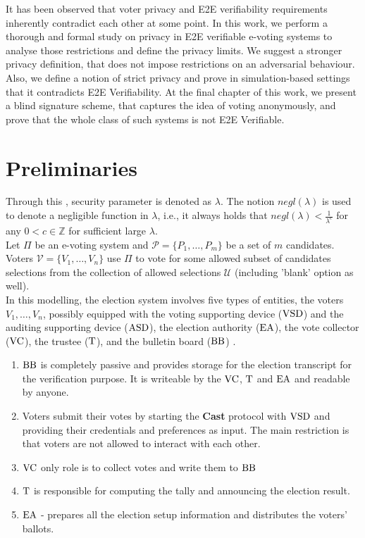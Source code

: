 It has been observed that voter privacy and E2E verifiability requirements inherently contradict each other at some point. In this work, we perform a thorough and formal study on privacy in E2E verifiable e-voting systems to analyse those restrictions and define the privacy limits. We suggest a stronger privacy definition, that does not impose restrictions on an adversarial behaviour. Also, we define a notion of strict privacy and prove in simulation-based settings that it contradicts E2E Verifiability. At the final chapter of this work, we present a blind signature scheme, that captures the idea of voting anonymously, and prove that the whole class of such systems is not E2E Verifiable.  

\section{Preliminaries}
Through this , security parameter is denoted as $\lambda$. The notion $negl(\lambda)$ is used to denote a negligible function in $\lambda$, i.e., it always holds that $negl(\lambda) < \frac{1}{\lambda^c}$ for any $0<c \in \mathbb{Z}$ for sufficient large $\lambda$. \\

Let $\Pi$ be an e-voting system and $\mathcal{P} = \{P_1,\dots,P_m\}$ be a set of $m$ candidates. Voters $\mathcal{V} = \{V_1,\dots,V_n\}$ use $\Pi$ to vote for some allowed subset of candidates selections from the collection of allowed selections $\mathcal{U}$ (including 'blank' option as well). \\
 
 In this modelling, the election system involves five types of entities, the voters $V_1, \dots , V_n$, possibly equipped with the voting supporting device ($\operatorname{VSD}$) and the auditing supporting device ($\operatorname{ASD}$), the election authority ($\operatorname{EA}$), the vote collector ($\operatorname{VC}$), the trustee ($\operatorname{T}$), and the bulletin board ($\operatorname{BB}$)  . 
\begin{enumerate}
\item $\operatorname{BB}$ is completely passive and provides storage for the election transcript for the verification purpose. It is writeable by the $\operatorname{VC}$, $\operatorname{T}$ and $\operatorname{EA}$ and readable by anyone. 
\item Voters submit their votes by starting the \textbf{Cast} protocol with $\operatorname{VSD}$ and providing their credentials and preferences as input. The main restriction is that voters are not allowed to interact with each other. 
\item $\operatorname{VC}$ only role is to collect votes and write them to $\operatorname{BB}$
\item $\operatorname{T}$ is responsible for computing the tally and announcing the election result.
\item $\operatorname{EA}$ - prepares all the election setup information and distributes the voters' ballots.
\end{enumerate}


